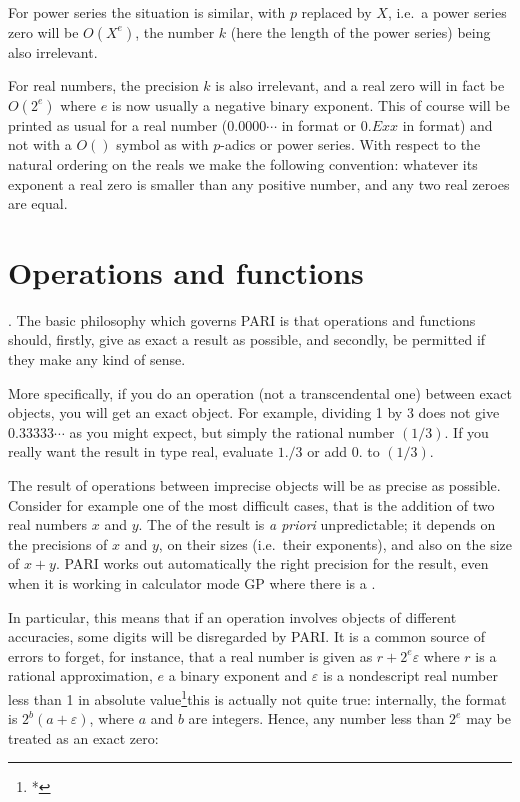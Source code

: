 For power series the situation is similar, with $p$ replaced by $X$, i.e.~a
power series zero will be $O(X^e)$, the number $k$ (here the length of the
power series) being also irrelevant.\label{se:whatzero}

For real numbers, the precision $k$ is also irrelevant, and a real zero will
in fact be $O(2^e)$ where $e$ is now usually a negative binary exponent. This
of course will be printed as usual for a real number ($0.0000\cdots$ in
 format or $0.Exx$ in  format) and not with a $O()$ symbol as
with $p$-adics or power series. With respect to the natural ordering on the
reals we make the following convention: whatever its exponent a real
zero is smaller than any positive number, and any two real zeroes are equal.

\section{Operations and functions}

.
The basic philosophy which governs PARI is that operations and functions
should, firstly, give as exact a result as possible, and secondly, be
permitted if they make any kind of sense.

More specifically, if you do an operation (not a transcendental one) between
exact objects, you will get an exact object. For example, dividing 1 by 3
does not give $0.33333\cdots$ as you might expect, but simply the rational
number $(1/3)$. If you really want the result in type real, evaluate $1./3$
or add $0.$ to $(1/3)$.

The result of operations between imprecise objects will be as precise as
possible. Consider for example one of the most difficult cases, that is the
addition of two real numbers $x$ and $y$. The  of the result is
\emph{a priori} unpredictable; it depends on the precisions of $x$ and $y$,
on their sizes (i.e.~their exponents), and also on the size of $x+y$. PARI
works out automatically the right precision for the result, even when it is
working in calculator mode GP where there is a .

In particular, this means that if an operation involves objects of
different accuracies, some digits will be disregarded by PARI. It is a
common source of errors to forget, for instance, that a real number is
given as $r + 2^e \varepsilon$ where $r$ is a rational approximation, $e$ a
binary exponent and $\varepsilon$ is a nondescript real number less than 1 in
absolute value\footnote{*}{this is actually not quite true: internally, the
format is $2^b (a + \varepsilon)$, where $a$ and $b$ are integers}. Hence,
any number less than $2^e$ may be treated as an exact zero:

